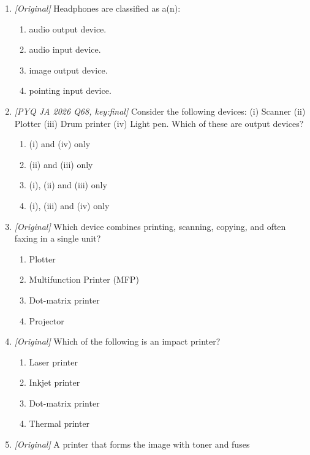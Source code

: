 \documentclass[11pt]{article}
\begin{document}
\begin{enumerate}[label=\textbf{Q\arabic*.}, leftmargin=*]
\begin{enumerate}[label=\Alph*.]
    \item Microphone
    \item Speaker
    \item Scanner
    \item Webcam
  \end{enumerate}
\item \textit{[Original]} Headphones are classified as a(n):
  \begin{enumerate}[label=\Alph*.]
    \item audio output device.
    \item audio input device.
    \item image output device.
    \item pointing input device.
  \end{enumerate}
\item \textit{[PYQ JA 2026 Q68, key:final]} Consider the following devices:
  (i) Scanner (ii) Plotter (iii) Drum printer (iv) Light pen. Which of these
  are output devices?
  \begin{enumerate}[label=\Alph*.]
    \item (i) and (iv) only
    \item (ii) and (iii) only
    \item (i), (ii) and (iii) only
    \item (i), (iii) and (iv) only
  \end{enumerate}
\item \textit{[Original]} Which device combines printing, scanning, copying,
  and often faxing in a single unit?
  \begin{enumerate}[label=\Alph*.]
    \item Plotter
    \item Multifunction Printer (MFP)
    \item Dot-matrix printer
    \item Projector
  \end{enumerate}
\item \textit{[Original]} Which of the following is an impact printer?
  \begin{enumerate}[label=\Alph*.]
    \item Laser printer
    \item Inkjet printer
    \item Dot-matrix printer
    \item Thermal printer
  \end{enumerate}
\item \textit{[Original]} A printer that forms the image with toner and fuses

\end{enumerate}
\end{document}
